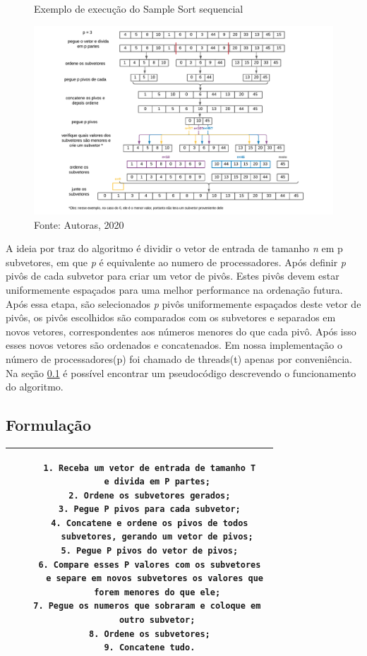 \documentclass[journal]{IEEEtran}
\begin{document}
\begin{figure}[!htbp]
    \centering
    \caption{Exemplo de execução do Sample Sort sequencial}
    \includegraphics[width=6in]{imagens/samplesortsequencial.pdf}
     \caption*{Fonte: Autoras, 2020}
    \label{fig:sequencial}
\end{figure}




A ideia por traz do algoritmo é dividir o vetor de entrada de tamanho \textit{n} em {p} subvetores, em que \textit{p} é equivalente ao numero de processadores. Após definir \textit{p} pivôs de cada subvetor para criar um vetor de pivôs. Estes pivôs devem estar uniformemente espaçados para uma melhor performance na ordenação futura. Após essa etapa, são selecionados \textit{p} pivôs uniformemente espaçados deste vetor de pivôs, os pivôs escolhidos são comparados com os subvetores e separados em novos vetores, correspondentes aos números menores do que cada pivô. Após isso esses novos vetores são ordenados e concatenados. Em nossa implementação o número de processadores(p) foi chamado de threads(t) apenas por conveniência. Na seção \ref{formulacao_seq} é possível encontrar um pseudocódigo descrevendo o funcionamento do algoritmo.

\subsection{Formulação}
\label{formulacao_seq}
\begin{table}[H]
    \centering
    \begin{tabular}{|c|}\hline
     \begin{lstlisting} 
    1. Receba um vetor de entrada de tamanho T
       e divida em P partes;
    2. Ordene os subvetores gerados;
    3. Pegue P pivos para cada subvetor;
    4. Concatene e ordene os pivos de todos
       subvetores, gerando um vetor de pivos;
    5. Pegue P pivos do vetor de pivos;
    6. Compare esses P valores com os subvetores
       e separe em novos subvetores os valores que 
       forem menores do que ele;
    7. Pegue os numeros que sobraram e coloque em 
       outro subvetor;
    8. Ordene os subvetores;
    9. Concatene tudo.
\end{lstlisting} \\
         \hline
    \end{tabular}
    \label{tab:pseudo_seq}
\end{table}
\end{document}

